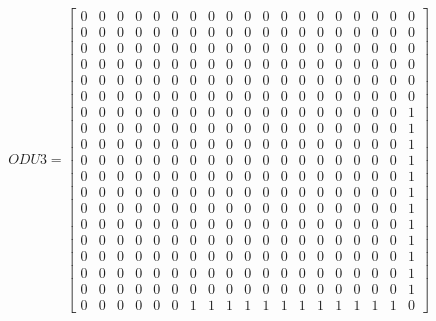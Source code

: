 \[
ODU3=
  \begin{bmatrix}
    0 & 0 & 0 & 0 & 0 & 0 & 0 & 0 & 0 & 0 & 0 & 0 & 0 & 0 & 0 & 0 & 0 & 0 & 0 \\
    0 & 0 & 0 & 0 & 0 & 0 & 0 & 0 & 0 & 0 & 0 & 0 & 0 & 0 & 0 & 0 & 0 & 0 & 0 \\
    0 & 0 & 0 & 0 & 0 & 0 & 0 & 0 & 0 & 0 & 0 & 0 & 0 & 0 & 0 & 0 & 0 & 0 & 0 \\
    0 & 0 & 0 & 0 & 0 & 0 & 0 & 0 & 0 & 0 & 0 & 0 & 0 & 0 & 0 & 0 & 0 & 0 & 0 \\
    0 & 0 & 0 & 0 & 0 & 0 & 0 & 0 & 0 & 0 & 0 & 0 & 0 & 0 & 0 & 0 & 0 & 0 & 0 \\
    0 & 0 & 0 & 0 & 0 & 0 & 0 & 0 & 0 & 0 & 0 & 0 & 0 & 0 & 0 & 0 & 0 & 0 & 0 \\
    0 & 0 & 0 & 0 & 0 & 0 & 0 & 0 & 0 & 0 & 0 & 0 & 0 & 0 & 0 & 0 & 0 & 0 & 1 \\
    0 & 0 & 0 & 0 & 0 & 0 & 0 & 0 & 0 & 0 & 0 & 0 & 0 & 0 & 0 & 0 & 0 & 0 & 1 \\
    0 & 0 & 0 & 0 & 0 & 0 & 0 & 0 & 0 & 0 & 0 & 0 & 0 & 0 & 0 & 0 & 0 & 0 & 1 \\
    0 & 0 & 0 & 0 & 0 & 0 & 0 & 0 & 0 & 0 & 0 & 0 & 0 & 0 & 0 & 0 & 0 & 0 & 1 \\
    0 & 0 & 0 & 0 & 0 & 0 & 0 & 0 & 0 & 0 & 0 & 0 & 0 & 0 & 0 & 0 & 0 & 0 & 1 \\
    0 & 0 & 0 & 0 & 0 & 0 & 0 & 0 & 0 & 0 & 0 & 0 & 0 & 0 & 0 & 0 & 0 & 0 & 1 \\
    0 & 0 & 0 & 0 & 0 & 0 & 0 & 0 & 0 & 0 & 0 & 0 & 0 & 0 & 0 & 0 & 0 & 0 & 1 \\
    0 & 0 & 0 & 0 & 0 & 0 & 0 & 0 & 0 & 0 & 0 & 0 & 0 & 0 & 0 & 0 & 0 & 0 & 1 \\
    0 & 0 & 0 & 0 & 0 & 0 & 0 & 0 & 0 & 0 & 0 & 0 & 0 & 0 & 0 & 0 & 0 & 0 & 1 \\
    0 & 0 & 0 & 0 & 0 & 0 & 0 & 0 & 0 & 0 & 0 & 0 & 0 & 0 & 0 & 0 & 0 & 0 & 1 \\
    0 & 0 & 0 & 0 & 0 & 0 & 0 & 0 & 0 & 0 & 0 & 0 & 0 & 0 & 0 & 0 & 0 & 0 & 1 \\
    0 & 0 & 0 & 0 & 0 & 0 & 0 & 0 & 0 & 0 & 0 & 0 & 0 & 0 & 0 & 0 & 0 & 0 & 1 \\
    0 & 0 & 0 & 0 & 0 & 0 & 1 & 1 & 1 & 1 & 1 & 1 & 1 & 1 & 1 & 1 & 1 & 1 & 0
  \end{bmatrix}
\]


